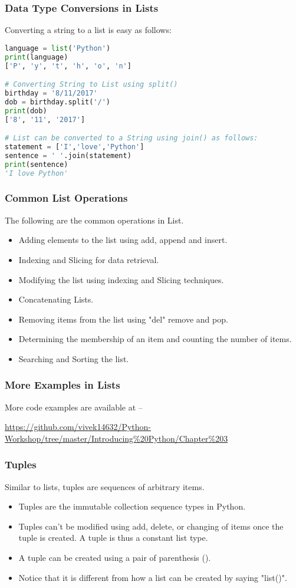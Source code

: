 \documentclass{beamer}
\begin{document}
\begin{frame}[fragile]
\frametitle{Data Type Conversions in Lists}
Converting a string to a list is easy as follows:
\begin{lstlisting}[language=Python]
language = list('Python')
print(language)
['P', 'y', 't', 'h', 'o', 'n']

# Converting String to List using split()
birthday = '8/11/2017'
dob = birthday.split('/')
print(dob)
['8', '11', '2017']

# List can be converted to a String using join() as follows:
statement = ['I','love','Python']
sentence = ' '.join(statement)
print(sentence)
'I love Python'
\end{lstlisting}
\end{frame}

\begin{frame}
\frametitle{Common List Operations}
The following are the common operations in List.
\begin{itemize}
\item Adding elements to the list using add, append and insert.
\item Indexing and Slicing for data retrieval.
\item Modifying the list using indexing and Slicing techniques.
\item Concatenating Lists.
\item Removing items from the list using "del" remove and pop.
\item Determining the membership of an item and counting the number of items.
\item Searching and Sorting the list.

\end{itemize}
\end{frame}

\begin{frame}
\frametitle{More Examples in Lists}
More code examples are available at --
 
\url{https://github.com/vivek14632/Python-Workshop/tree/master/Introducing\%20Python/Chapter\%203}
\end{frame}

\begin{frame}
\frametitle{Tuples}
Similar to lists, tuples are sequences of arbitrary items. 
\begin{itemize}
\item Tuples are the immutable collection sequence types in Python.
\item Tuples can’t be modified using add, delete, or changing of items once the tuple is created. A tuple is thus a constant list type.
\item A tuple can be created using a pair of parenthesis ().
\item Notice that it is different from how a list can be created by saying "list()".
\end{itemize}
\end{frame}
\end{document}
